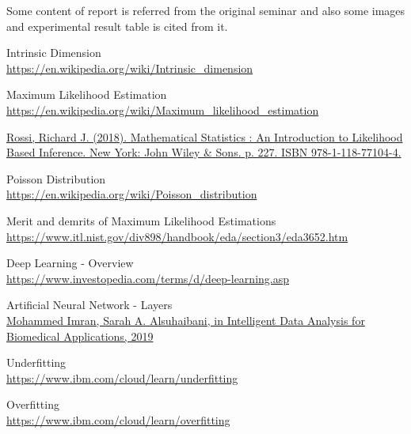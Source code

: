 \documentclass[12pt,letterpaper]{report}
\begin{document}
\begin{thebibliography}{15}

Some content of report is referred from the original seminar and also some images and experimental result table is cited from it. 

Intrinsic Dimension
\\\href{https://en.wikipedia.org/wiki/Intrinsic\_dimension}{https://en.wikipedia.org/wiki/Intrinsic\_dimension}

Maximum Likelihood Estimation \\\href{https://en.wikipedia.org/wiki/Maximum\_{}likelihood\_{}estimation}{https://en.wikipedia.org/wiki/Maximum\_{}likelihood\_{}estimation}

 \href{Rossi, Richard J. (2018). Mathematical Statistics : An Introduction to Likelihood Based Inference. New York: John Wiley \& Sons. p. 227. ISBN 978-1-118-77104-4.}{Rossi, Richard J. (2018). Mathematical Statistics : An Introduction to Likelihood Based Inference. New York: John Wiley \& Sons. p. 227. ISBN 978-1-118-77104-4.}
 
Poisson Distribution \\\href{https://en.wikipedia.org/wiki/Poisson\_{}distribution}{https://en.wikipedia.org/wiki/Poisson\_{}distribution}

Merit and demrits of Maximum Likelihood Estimations
\\\href{https://www.itl.nist.gov/div898/handbook/eda/section3/eda3652.htm}{https://www.itl.nist.gov/div898/handbook/eda/section3/eda3652.htm}

Deep Learning - Overview
\\\href{https://www.investopedia.com/terms/d/deep-learning.asp}{https://www.investopedia.com/terms/d/deep-learning.asp}

Artificial Neural Network - Layers
\\\href{https://www.sciencedirect.com/topics/computer-science/artificial-neural-network}{Mohammed Imran, Sarah A. Alsuhaibani, in Intelligent Data Analysis for Biomedical Applications, 2019}

Underfitting 
\\\href{https://www.ibm.com/cloud/learn/underfitting}{https://www.ibm.com/cloud/learn/underfitting}

Overfitting 
\\\href{https://www.ibm.com/cloud/learn/overfitting}{https://www.ibm.com/cloud/learn/overfitting}


\end{thebibliography}
\end{document}

